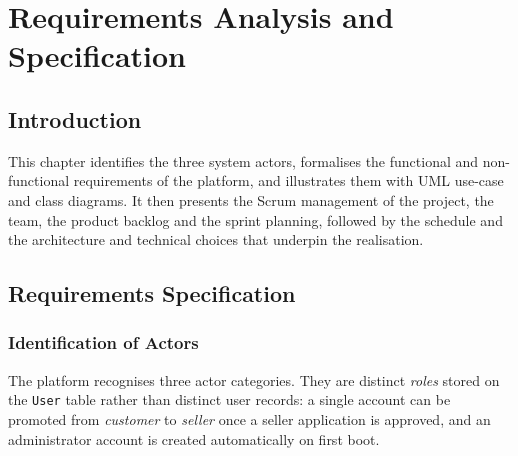 \chapter{Requirements Analysis and Specification}
\label{chap:requirements}

\section*{Introduction}

This chapter identifies the three system actors, formalises the
functional and non-functional requirements of the platform, and
illustrates them with UML use-case and class diagrams. It then presents
the Scrum management of the project, the team, the product backlog
and the sprint planning, followed by the schedule and the
architecture and technical choices that underpin the realisation.

\section{Requirements Specification}

\subsection{Identification of Actors}

The platform recognises three actor categories. They are distinct
\textit{roles} stored on the \texttt{User} table rather than distinct
user records: a single account can be promoted from \textit{customer}
to \textit{seller} once a seller application is approved, and an
administrator account is created automatically on first boot.

